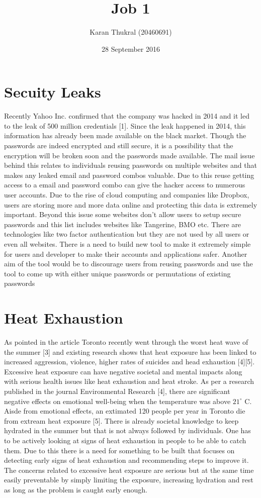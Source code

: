 \documentclass{article}
\title{Job 1}
\author{Karan Thukral (20460691)}
\date{28 September 2016}
\begin{document}
\maketitle

\section{Secuity Leaks}
Recently Yahoo Inc. confirmed that the company was hacked in 2014 and it led to the leak of 500 million credentials [1]. Since the leak happened in 2014, this information has already been made available on the black market. Though the passwords are indeed encrypted and still secure, it is a possibility that the encryption will be broken soon and the passwords made available. The mail issue behind this relates to individuals reusing passwords on multiple websites and that makes any leaked email and password combos valuable. Due to this reuse getting access to a email and password combo can give the hacker access to numerous user accounts. Due to the rise of cloud computing and companies like Dropbox, users are storing more and more data online and protecting this data is extremely important. Beyond this issue some websites don't allow users to setup secure passwords and this list includes websites like Tangerine, BMO etc. There are technologies like two factor authentication but they are not used by all users or even all websites. There is a need to build new tool to make it extremely simple for users and developer to make their accounts and applications safer. Another aim of the tool would be to discourage users from reusing passwords and use the tool to come up with either unique passwords or permutations of existing passwords

\section{Heat Exhaustion}
As pointed in the article Toronto recently went through the worst heat wave of the summer [3] and existing research shows that heat exposure has been linked to increased aggression, violence, higher rates of suicides and head exhaustion [4][5]. Excessive heat exposure can have negative societal and mental impacts along with serious health issues like heat exhaustion and heat stroke. As per a research published in the journal Environmental Research [4], there are significant negative effects on emotional well-being when the temperature was above $21^\circ$ C. Aisde from emotional effects, an extimated 120 people per year in Toronto die from extream heat exposure [5]. There is already societal knowledge to keep hydrated in the summer but that is not always followed by individuals. One has to be actively looking at signs of heat exhaustion in people to be able to catch them. Due to this there is a need for something to be built that focuses on detecting early signs of heat exhaustion and recommending steps to improve it. The concerns related to excessive heat exposure are serious but at the same time easily preventable by simply limiting the exposure, increasing hydration and rest as long as the problem is caught early enough. 
\end{document}
